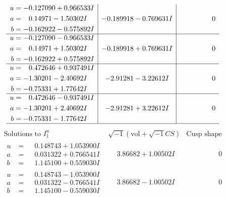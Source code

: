 \documentclass[1p]{elsarticle_modified}
\theoremstyle{definition}
\newcommand{\I}{\sqrt{-1}}
\begin{document}
$$\begin{array}{c|c|c}
\begin{aligned}
u &= -0.127090 + 0.966533 I \\
a &= \phantom{-}0.14971 - 1.50302 I \\
b &= -0.162922 - 0.575892 I\end{aligned}
 & -0.189918 - 0.769631 I & \phantom{-0.000000 } 0 \\ \hline\begin{aligned}
u &= -0.127090 - 0.966533 I \\
a &= \phantom{-}0.14971 + 1.50302 I \\
b &= -0.162922 + 0.575892 I\end{aligned}
 & -0.189918 + 0.769631 I & \phantom{-0.000000 } 0 \\ \hline\begin{aligned}
u &= \phantom{-}0.472646 + 0.937491 I \\
a &= -1.30201 - 2.40692 I \\
b &= -0.75331 + 1.77642 I\end{aligned}
 & -2.91281 - 3.22612 I & \phantom{-0.000000 } 0 \\ \hline\begin{aligned}
u &= \phantom{-}0.472646 - 0.937491 I \\
a &= -1.30201 + 2.40692 I \\
b &= -0.75331 - 1.77642 I\end{aligned}
 & -2.91281 + 3.22612 I & \phantom{-0.000000 } 0\\
 \hline 
 \end{array}$$\newpage$$\begin{array}{c|c|c}  
\text{Solutions to }I^u_{1}& \I (\text{vol} + \sqrt{-1}CS) & \text{Cusp shape}\\
 \hline 
\begin{aligned}
u &= \phantom{-}0.148743 + 1.053900 I \\
a &= \phantom{-}0.031322 + 0.766541 I \\
b &= \phantom{-}1.145100 + 0.559030 I\end{aligned}
 & \phantom{-}3.86682 + 1.00502 I & \phantom{-0.000000 } 0 \\ \hline\begin{aligned}
u &= \phantom{-}0.148743 - 1.053900 I \\
a &= \phantom{-}0.031322 - 0.766541 I \\
b &= \phantom{-}1.145100 - 0.559030 I\end{aligned}
 & \phantom{-}3.86682 - 1.00502 I & \phantom{-0.000000 } 0 \\ \hline\begin{aligned}

\end{aligned}
\end{array}$$
\end{document}
